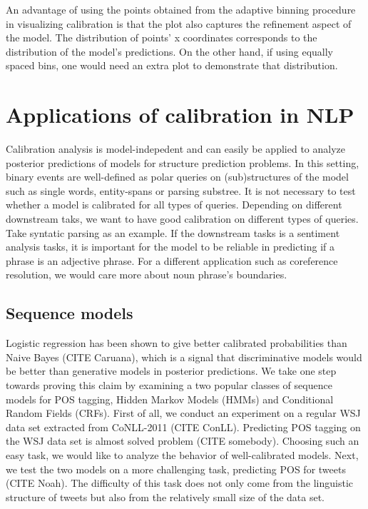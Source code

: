 An advantage of using the points obtained from the adaptive binning procedure in visualizing calibration is that the plot also captures the refinement aspect of the model. The distribution of points' x coordinates corresponds to the distribution of the model's predictions. On the other hand, if using equally spaced bins, one would need an extra plot to demonstrate that distribution. 

\section{Applications of calibration in NLP}

Calibration analysis is model-indepedent and can easily be applied to analyze posterior predictions of models for structure prediction problems. In this setting, binary events are well-defined as polar queries on (sub)structures of the model such as single words, entity-spans or parsing substree. It is not necessary to test whether a model is calibrated for all types of queries. Depending on different downstream taks, we want to have good calibration on different types of queries. Take syntatic parsing as an example. If the downstream tasks is a sentiment analysis tasks, it is important for the model to be reliable in predicting if a phrase is an adjective phrase. For a different application such as coreference resolution, we would care more about noun phrase's boundaries.

\subsection{Sequence models}

Logistic regression has been shown to give better calibrated probabilities than Naive Bayes (CITE Caruana), which is a signal that discriminative models would be better than generative models in posterior predictions. We take one step towards proving this claim by examining a two popular classes of sequence models for POS tagging, Hidden Markov Models (HMMs) and Conditional Random Fields (CRFs). First of all, we conduct an experiment on a regular WSJ data set extracted from CoNLL-2011 (CITE ConLL). Predicting POS tagging on the WSJ data set is almost solved problem (CITE somebody). Choosing such an easy task, we would like to analyze the behavior of well-calibrated models. Next, we test the two models on a more challenging task, predicting POS for tweets (CITE Noah). The difficulty of this task does not only come from the linguistic structure of tweets but also from the relatively small size of the data set. 

